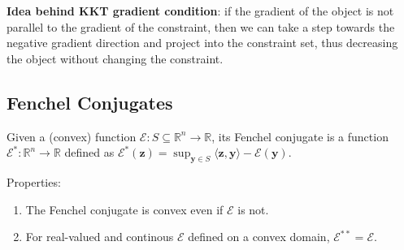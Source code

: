 \textbf{Idea behind KKT gradient condition}: if the gradient of the object is not parallel to the gradient of the constraint, then we can take a step towards the negative gradient direction and project into the constraint set, thus decreasing the object without changing the constraint.

\subsection{Fenchel Conjugates}

 Given a (convex) function $\mathcal{E}: S \subseteq \mathbb{R}^{n} \rightarrow \mathbb{R}$, its Fenchel conjugate is a function $\mathcal{E}^{*}: \mathbb{R}^{n} \rightarrow \mathbb{R}$ defined as
$
\mathcal{E}^{*}(\boldsymbol{z})=\sup _{\boldsymbol{y} \in S}\langle\boldsymbol{z}, \boldsymbol{y}\rangle-\mathcal{E}(\boldsymbol{y}).
$

Properties:
\begin{enumerate}
    \item The Fenchel conjugate is convex even if $\mathcal{E}$ is not.
    \item For real-valued and continous $\mathcal{E}$ defined on a convex domain, $\mathcal{E}^{**} = \mathcal{E}$.
\end{enumerate}
